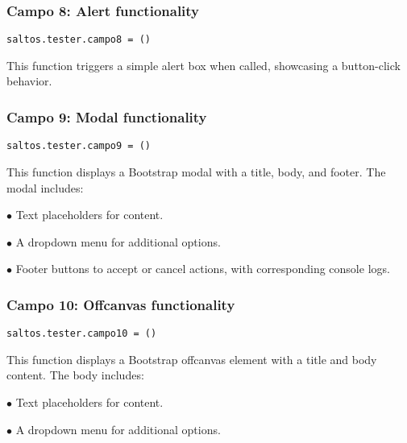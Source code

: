 \documentclass[a4paper]{article}
\begin{document}
\hypertarget{toc151}{}
\subsubsection{Campo 8: Alert functionality}

\begin{lstlisting}
saltos.tester.campo8 = ()
\end{lstlisting}

This function triggers a simple alert box when called, showcasing a button-click behavior.

\hypertarget{toc152}{}
\subsubsection{Campo 9: Modal functionality}

\begin{lstlisting}
saltos.tester.campo9 = ()
\end{lstlisting}

This function displays a Bootstrap modal with a title, body, and footer. The modal includes:

\begin{compactitem}
\item[\color{myblue}$\bullet$] Text placeholders for content.
\item[\color{myblue}$\bullet$] A dropdown menu for additional options.
\item[\color{myblue}$\bullet$] Footer buttons to accept or cancel actions, with corresponding console logs.
\end{compactitem}

\hypertarget{toc153}{}
\subsubsection{Campo 10: Offcanvas functionality}

\begin{lstlisting}
saltos.tester.campo10 = ()
\end{lstlisting}

This function displays a Bootstrap offcanvas element with a title and body content.
The body includes:

\begin{compactitem}
\item[\color{myblue}$\bullet$] Text placeholders for content.
\item[\color{myblue}$\bullet$] A dropdown menu for additional options.
\end{compactitem}
\end{document}
